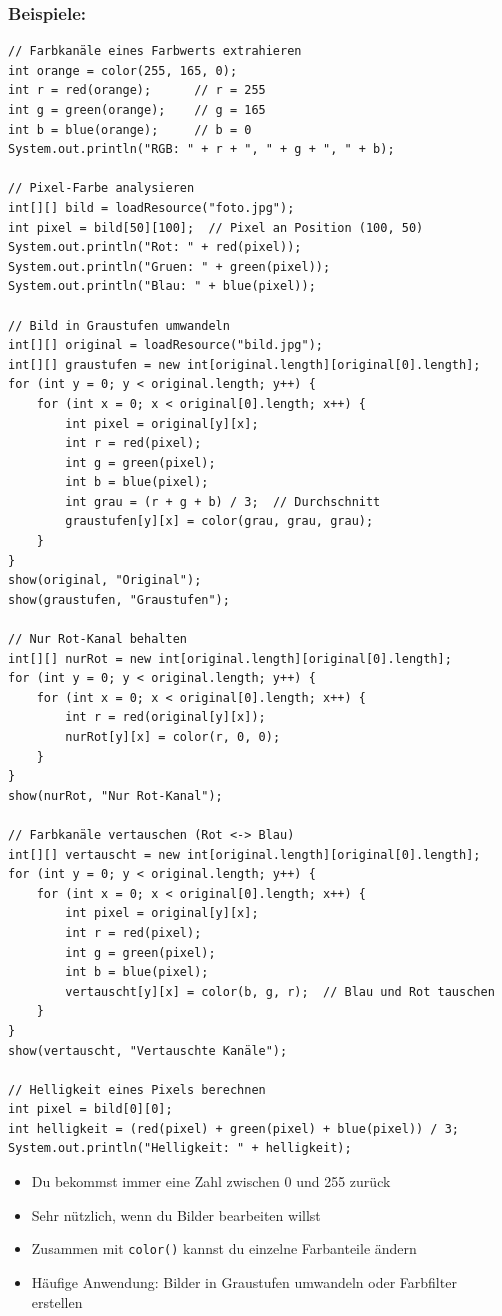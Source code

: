 \subsubsection*{Beispiele:}
\begin{lstlisting}
// Farbkanäle eines Farbwerts extrahieren
int orange = color(255, 165, 0);
int r = red(orange);      // r = 255
int g = green(orange);    // g = 165
int b = blue(orange);     // b = 0
System.out.println("RGB: " + r + ", " + g + ", " + b);

// Pixel-Farbe analysieren
int[][] bild = loadResource("foto.jpg");
int pixel = bild[50][100];  // Pixel an Position (100, 50)
System.out.println("Rot: " + red(pixel));
System.out.println("Gruen: " + green(pixel));
System.out.println("Blau: " + blue(pixel));

// Bild in Graustufen umwandeln
int[][] original = loadResource("bild.jpg");
int[][] graustufen = new int[original.length][original[0].length];
for (int y = 0; y < original.length; y++) {
    for (int x = 0; x < original[0].length; x++) {
        int pixel = original[y][x];
        int r = red(pixel);
        int g = green(pixel);
        int b = blue(pixel);
        int grau = (r + g + b) / 3;  // Durchschnitt
        graustufen[y][x] = color(grau, grau, grau);
    }
}
show(original, "Original");
show(graustufen, "Graustufen");

// Nur Rot-Kanal behalten
int[][] nurRot = new int[original.length][original[0].length];
for (int y = 0; y < original.length; y++) {
    for (int x = 0; x < original[0].length; x++) {
        int r = red(original[y][x]);
        nurRot[y][x] = color(r, 0, 0);
    }
}
show(nurRot, "Nur Rot-Kanal");

// Farbkanäle vertauschen (Rot <-> Blau)
int[][] vertauscht = new int[original.length][original[0].length];
for (int y = 0; y < original.length; y++) {
    for (int x = 0; x < original[0].length; x++) {
        int pixel = original[y][x];
        int r = red(pixel);
        int g = green(pixel);
        int b = blue(pixel);
        vertauscht[y][x] = color(b, g, r);  // Blau und Rot tauschen
    }
}
show(vertauscht, "Vertauschte Kanäle");

// Helligkeit eines Pixels berechnen
int pixel = bild[0][0];
int helligkeit = (red(pixel) + green(pixel) + blue(pixel)) / 3;
System.out.println("Helligkeit: " + helligkeit);
\end{lstlisting}

\begin{achtung}
	\begin{itemize}
		\item Du bekommst immer eine Zahl zwischen 0 und 255 zurück
		\item Sehr nützlich, wenn du Bilder bearbeiten willst
		\item Zusammen mit \texttt{color()} kannst du einzelne Farbanteile ändern
		\item Häufige Anwendung: Bilder in Graustufen umwandeln oder Farbfilter erstellen
	\end{itemize}
\end{achtung}

